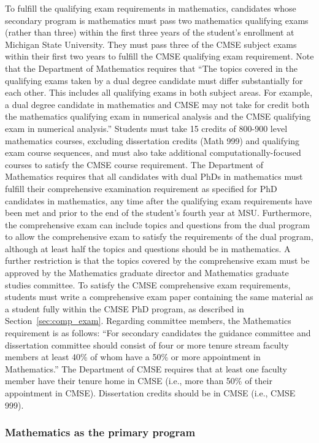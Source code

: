 To fulfill the qualifying exam requirements in mathematics, candidates
whose secondary program is mathematics must pass two mathematics
qualifying exams (rather than three) within the first three years of
the student’s enrollment at Michigan State University.  They must pass
three of the CMSE subject exams within their first two years to
fulfill the CMSE qualifying exam requirement.  Note that the
Department of Mathematics requires that ``The topics covered in the
qualifying exams taken by a dual degree candidate must differ
substantially for each other. This includes all qualifying exams in
both subject areas. For example, a dual degree candidate in
mathematics and CMSE may not take for credit both the mathematics
qualifying exam in numerical analysis and the CMSE qualifying exam in
numerical analysis.''  Students must take 15 credits of 800-900 level
mathematics courses, excluding dissertation credits (Math 999) and
qualifying exam course sequences, and must also take additional
computationally-focused courses to satisfy the CMSE course
requirement.  The Department of Mathematics requires that all
candidates with dual PhDs in mathematics must fulfill their
comprehensive examination requirement as specified for PhD candidates
in mathematics, any time after the qualifying exam requirements have
been met and prior to the end of the student's fourth year at MSU.
Furthermore, the comprehensive exam can include topics and questions
from the dual program to allow the comprehensive exam to satisfy the
requirements of the dual program, although at least half the topics
and questions should be in mathematics.  A further restriction is that
the topics covered by the comprehensive exam must be approved by the
Mathematics graduate director and Mathematics graduate studies
committee.  To satisfy the CMSE comprehensive exam requirements,
students must write a comprehensive exam paper containing the same
material as a student fully within the CMSE PhD program, as described
in Section~\ref{sec:comp_exam}.  Regarding committee members, the
Mathematics requirement is as follows: ``For secondary candidates the
guidance committee and dissertation committee should consist of four
or more tenure stream faculty members at least 40\% of whom have a
50\% or more appointment in Mathematics.''  The Department of CMSE
requires that at least one faculty member have their tenure home in
CMSE (i.e., more than 50\% of their appointment in CMSE).
Dissertation credits should be in CMSE (i.e., CMSE 999).

\subsubsection{Mathematics as the primary program}

